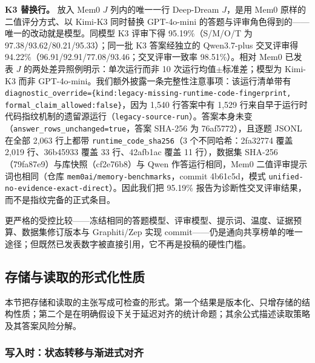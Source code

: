 \textbf{K3 替换行。}
\label{app:k3-substitution}
放入 Mem0 $J$ 列内的唯一一行 Deep-Dream $J$，是用 Mem0 原样的二值评分方式、以 Kimi-K3 同时替换 GPT-4o-mini 的答题与评审角色得到的——唯一的改动就是模型。同模型 K3 评审下得 95.19\%（S/M/O/T 为 97.38/93.62/80.21/95.33）；同一批 K3 答案经独立的 Qwen3.7-plus 交叉评审得 94.22\%（96.91/92.91/77.08/93.46；交叉评审一致率 98.51\%）。相对 Mem0 已发表 $J$ 的两处差异照例明示：单次运行而非 10 次运行均值$\pm$标准差；模型为 Kimi-K3 而非 GPT-4o-mini。我们额外披露一条完整性注意事项：该运行清单带有 \texttt{diagnostic\_override=\{kind:legacy-missing-runtime-code-fingerprint, formal\_claim\_allowed:false\}}，因为 1{,}540 行答案中有 1{,}529 行来自早于运行时代码指纹机制的遗留源运行（\texttt{legacy-source-run}）。答案本身未变（\texttt{answer\_rows\_unchanged=true}，答案 SHA-256 为 76af5772），且逐题 JSONL 在全部 2{,}063 行上都带 \texttt{runtime\_code\_sha256}（3 个不同哈希：2fa32774 覆盖 2{,}019 行、36b45933 覆盖 33 行、42afb1ac 覆盖 11 行），数据集 SHA-256（79fa87e9）与库快照（cf2e76b8）与 Qwen 作答运行相同，Mem0 二值评审提示词也相同（仓库 \texttt{mem0ai/memory-benchmarks}，commit 4b61c5d，模式 \texttt{unified-no-evidence-exact-direct}）。因此我们把 95.19\% 报告为诊断性交叉评审结果，而不是指纹完备的正式条目。

更严格的受控比较——冻结相同的答题模型、评审模型、提示词、温度、证据预算、数据集修订版本与 Graphiti/Zep 实现 commit——仍是通向共享榜单的唯一途径；但既然已发表数字被直接引用，它不再是投稿的硬性门槛。

\subsection{存储与读取的形式化性质}
\label{app:info-theory}

本节把存储和读取的主张写成可检查的形式。第一个结果是版本化、只增存储的结构性质；第二个是在明确假设下关于延迟对齐的统计命题；其余公式描述读取策略及其答案风险分解。

\subsubsection{写入时：状态转移与渐进式对齐}

